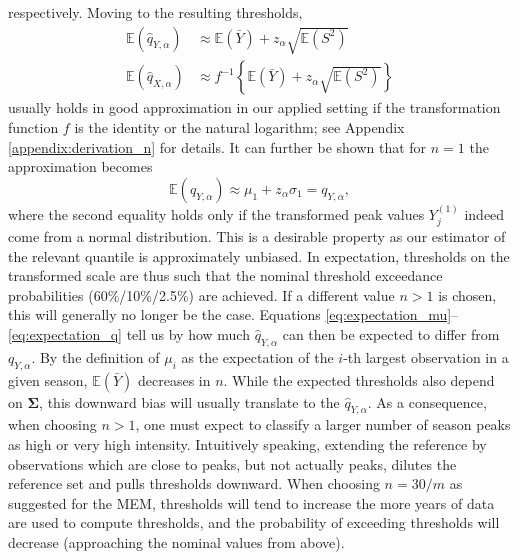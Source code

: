 \documentclass{article}
\newcommand{\sd}{s}
\begin{document}
respectively. Moving to the resulting thresholds,
\begin{align}
\mathbb{E}(\hat{q}_{Y, \alpha}) & \approx \mathbb{E}(\bar{Y}) + z_\alpha \sqrt{\mathbb{E}(S^2)}
\label{eq:expectation_q}\\
\mathbb{E}(\hat{q}_{X, \alpha}) & \approx f^{-1}\left\{\mathbb{E}(\bar{Y}) + z_\alpha \sqrt{\mathbb{E}(S^2)}\right\}
\label{eq:expectation_q2}
\end{align}
usually holds in good approximation in our applied setting if the transformation function $f$ is the identity or the natural logarithm; see Appendix \ref{appendix:derivation_n} for details. It can further be shown that for $n = 1$ the approximation becomes
$$
\mathbb{E}(\hat{q}_{Y, \alpha}) \approx \mu_1 + z_\alpha \sigma_1 = q_{Y, \alpha},
$$
where the second equality holds only if the transformed peak values $Y_{j}^{(1)}$ indeed come from a normal distribution.  This is a desirable property as our estimator of the relevant quantile is approximately unbiased. In expectation, thresholds on the transformed scale are thus such that the nominal threshold exceedance probabilities (60\%/10\%/2.5\%) are achieved. If a different value $n > 1$ is chosen, this will generally no longer be the case. Equations \eqref{eq:expectation_mu}--\eqref{eq:expectation_q} tell us by how much $\hat{q}_{Y, \alpha}$ can then be expected to differ from $q_{Y, \alpha}$. By the definition of $\mu_i$ as the expectation of the $i$-th largest observation in a given season, $\mathbb{E}(\bar{Y})$ decreases in $n$. While the expected thresholds also depend on $\mathbf{\Sigma}$, this downward bias will usually translate to the $\hat{q}_{Y, \alpha}$. As a consequence, when choosing $n > 1$, one must expect to classify a larger number of season peaks as high or very high intensity. Intuitively speaking, extending the reference by observations which are close to peaks, but not actually peaks, dilutes the reference set and pulls thresholds downward. When choosing $n = 30/m$ as suggested for the MEM, thresholds will tend to increase the more years of data are used to compute thresholds, and the probability of exceeding thresholds will decrease (approaching the nominal values from above). 
\end{document}
